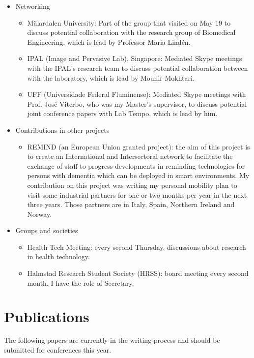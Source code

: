 \documentclass[]{report}
\begin{document}
\begin{itemize}
	\item Networking
	\begin{itemize}
		\item M\"{a}lardalen University: Part of the group that visited on May 19 to discuss potential collaboration with the research group of Biomedical Engineering, which is lead by Professor Maria Lind\'{e}n. 
		\item IPAL (Image and Pervasive Lab), Singapore: Mediated Skype meetings with the IPAL's research team to discuss potential collaboration between with the laboratory, which is lead by Mounir Mokhtari.
		\item UFF (Universidade Federal Fluminense): Mediated Skype meetings with Prof. Jos\'{e} Viterbo, who was my Master's supervisor, to discuss potential joint conference papers with Lab Tempo, which is lead by him.
	\end{itemize}
	\item Contributions in other projects
	\begin{itemize}
		\item REMIND (an European Union granted project): the aim of this project is to create an International and Intersectoral network to facilitate the exchange of staff to progress developments in reminding technologies for persons with dementia which can be deployed in smart environments. My contribution on this project was writing my personal mobility plan to visit some industrial partners for one or two months per year in the next three years. Those partners are in Italy, Spain, Northern Ireland and Norway.
	\end{itemize}
	\item Groups and societies
	\begin{itemize}
		\item Health Tech Meeting: every second Thursday, discussions about research in health technology.
		\item Halmstad Research Student Society (HRSS): board meeting every second month. I have the role of Secretary.
	\end{itemize}
\end{itemize}

\section*{Publications}

The following papers are currently in the writing process and should be submitted for conferences this year.
\end{document}
